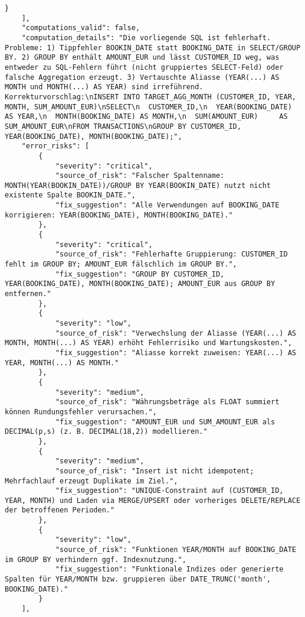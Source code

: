 \begin{lstlisting}[caption={Ausgabe: GPT-5 Anwendungsfall 1 Robustheitsdurchlauf},label={gpt_case1_prompt3}]
        }
    ],
    "computations_valid": false,
    "computation_details": "Die vorliegende SQL ist fehlerhaft. Probleme: 1) Tippfehler BOOKIN_DATE statt BOOKING_DATE in SELECT/GROUP BY. 2) GROUP BY enthält AMOUNT_EUR und lässt CUSTOMER_ID weg, was entweder zu SQL-Fehlern führt (nicht gruppiertes SELECT-Feld) oder falsche Aggregation erzeugt. 3) Vertauschte Aliasse (YEAR(...) AS MONTH und MONTH(...) AS YEAR) sind irreführend. Korrekturvorschlag:\nINSERT INTO TARGET_AGG_MONTH (CUSTOMER_ID, YEAR, MONTH, SUM_AMOUNT_EUR)\nSELECT\n  CUSTOMER_ID,\n  YEAR(BOOKING_DATE)  AS YEAR,\n  MONTH(BOOKING_DATE) AS MONTH,\n  SUM(AMOUNT_EUR)     AS SUM_AMOUNT_EUR\nFROM TRANSACTIONS\nGROUP BY CUSTOMER_ID, YEAR(BOOKING_DATE), MONTH(BOOKING_DATE);",
    "error_risks": [
        {
            "severity": "critical",
            "source_of_risk": "Falscher Spaltenname: MONTH(YEAR(BOOKIN_DATE))/GROUP BY YEAR(BOOKIN_DATE) nutzt nicht existente Spalte BOOKIN_DATE.",
            "fix_suggestion": "Alle Verwendungen auf BOOKING_DATE korrigieren: YEAR(BOOKING_DATE), MONTH(BOOKING_DATE)."
        },
        {
            "severity": "critical",
            "source_of_risk": "Fehlerhafte Gruppierung: CUSTOMER_ID fehlt im GROUP BY; AMOUNT_EUR fälschlich im GROUP BY.",
            "fix_suggestion": "GROUP BY CUSTOMER_ID, YEAR(BOOKING_DATE), MONTH(BOOKING_DATE); AMOUNT_EUR aus GROUP BY entfernen."
        },
        {
            "severity": "low",
            "source_of_risk": "Verwechslung der Aliasse (YEAR(...) AS MONTH, MONTH(...) AS YEAR) erhöht Fehlerrisiko und Wartungskosten.",
            "fix_suggestion": "Aliasse korrekt zuweisen: YEAR(...) AS YEAR, MONTH(...) AS MONTH."
        },
        {
            "severity": "medium",
            "source_of_risk": "Währungsbeträge als FLOAT summiert können Rundungsfehler verursachen.",
            "fix_suggestion": "AMOUNT_EUR und SUM_AMOUNT_EUR als DECIMAL(p,s) (z. B. DECIMAL(18,2)) modellieren."
        },
        {
            "severity": "medium",
            "source_of_risk": "Insert ist nicht idempotent; Mehrfachlauf erzeugt Duplikate im Ziel.",
            "fix_suggestion": "UNIQUE-Constraint auf (CUSTOMER_ID, YEAR, MONTH) und Laden via MERGE/UPSERT oder vorheriges DELETE/REPLACE der betroffenen Perioden."
        },
        {
            "severity": "low",
            "source_of_risk": "Funktionen YEAR/MONTH auf BOOKING_DATE im GROUP BY verhindern ggf. Indexnutzung.",
            "fix_suggestion": "Funktionale Indizes oder generierte Spalten für YEAR/MONTH bzw. gruppieren über DATE_TRUNC('month', BOOKING_DATE)."
        }
    ],

\end{lstlisting}
